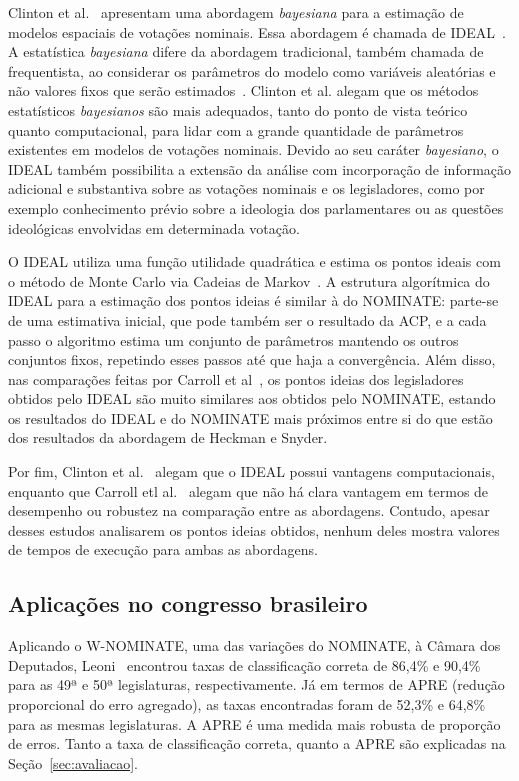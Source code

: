 \documentclass[
	article,			%
	12pt,				%
	oneside,			%
	a4paper,			%
	english,			%
	brazil,				%
	sumario=tradicional,
	oldfontcommands %
	]{abntex2}
\newcommand\nominate{NOMINATE\xspace}
\newcommand\wnominate{W-NOMINATE\xspace}
\begin{document}
Clinton et al.~\cite{clinton2004ideal} apresentam uma abordagem \emph{bayesiana} para a estimação de modelos espaciais de votações nominais. Essa abordagem é chamada de IDEAL~\cite{carroll2009comparing}. A estatística \emph{bayesiana} difere da abordagem tradicional, também chamada de frequentista, ao considerar os parâmetros do modelo como variáveis aleatórias e não valores fixos que serão estimados~\cite{gelman2003bayesian}. Clinton et al. alegam que os métodos estatísticos \emph{bayesianos} são mais adequados, tanto do ponto de vista teórico quanto computacional, para lidar com a grande quantidade de parâmetros existentes em modelos de votações nominais. Devido ao seu caráter \emph{bayesiano}, o IDEAL também possibilita a extensão da análise com incorporação de informação adicional e substantiva sobre as votações nominais e os legisladores, como por exemplo conhecimento prévio sobre a ideologia dos parlamentares ou as questões ideológicas envolvidas em determinada votação.

O IDEAL utiliza uma função utilidade quadrática e estima os pontos ideais com o método de Monte Carlo via Cadeias de Markov~\cite{tierney1996mcmc}. A estrutura algorítmica do IDEAL para a estimação dos pontos ideias é similar à do \nominate: parte-se de uma estimativa inicial, que pode também ser o resultado da ACP, e a cada passo o algoritmo estima um conjunto de parâmetros mantendo os outros conjuntos fixos, repetindo esses passos até que haja a convergência. Além disso, nas comparações feitas por Carroll et al~\cite{carroll2009comparing}, os pontos ideias dos legisladores obtidos pelo IDEAL são muito similares aos obtidos pelo \nominate, estando os resultados do IDEAL e do \nominate mais próximos entre si do que estão dos resultados da abordagem de Heckman e Snyder.

Por fim, Clinton et al.~\cite{clinton2004ideal} alegam que o IDEAL possui vantagens computacionais, enquanto que Carroll etl al.~\cite{carroll2009comparing} alegam que não há clara vantagem em termos de desempenho ou robustez na comparação entre as abordagens. Contudo, apesar desses estudos analisarem os pontos ideias obtidos, nenhum deles mostra valores de tempos de execução para ambas as abordagens. 

\subsection{Aplicações no congresso brasileiro}

Aplicando o \wnominate, uma das variações do \nominate, à Câmara dos Deputados, Leoni~\cite{leoni02cdep} encontrou taxas de classificação correta de 86,4\% e 90,4\% para as 49ª e 50ª legislaturas, respectivamente. Já em termos de APRE (redução proporcional do erro agregado), as taxas encontradas foram de 52,3\% e 64,8\% para as mesmas legislaturas. A APRE é uma medida mais robusta de proporção de erros. Tanto a taxa de classificação correta, quanto a APRE são explicadas na Seção~\ref{sec:avaliacao}.
\end{document}
